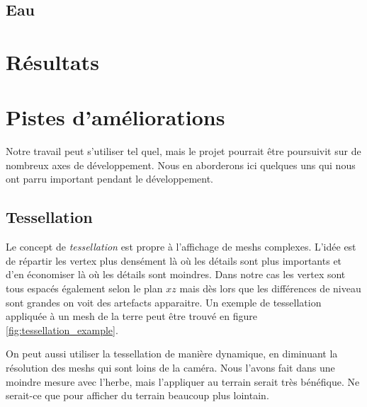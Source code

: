 \documentclass[11pt]{article} %
\begin{document}

\subsection{Eau}



\section{Résultats}


\section{Pistes d'améliorations}

Notre travail peut s'utiliser tel quel, mais le projet pourrait être poursuivit sur de nombreux axes de développement. Nous en aborderons ici quelques uns qui nous ont parru important pendant le développement.

\subsection{Tessellation}

Le concept de \textit{tessellation} est propre à l'affichage de meshs complexes. L'idée est de répartir les vertex plus densément là où les détails sont plus importants et d'en économiser là où les détails sont moindres. Dans notre cas les vertex sont tous espacés également selon le plan $xz$ mais dès lors que les différences de niveau sont grandes on voit des artefacts apparaitre. Un exemple de tessellation appliquée à un mesh de la terre peut être trouvé en figure \ref{fig:tessellation_example}.
\par
On peut aussi utiliser la tessellation de manière dynamique, en diminuant la résolution des meshs qui sont loins de la caméra. Nous l'avons fait dans une moindre mesure avec l'herbe, mais l'appliquer au terrain serait très bénéfique. Ne serait-ce que pour afficher du terrain beaucoup plus lointain.
\end{document}
